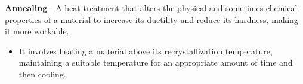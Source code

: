 \vspace{0.5cm}
    \textbf{Annealing} - A heat treatment that alters the physical and sometimes chemical properties of a material to increase its ductility and reduce its hardness, making it more workable.
    \vspace{0.15cm}
    \begin{itemize}
        \setlength\itemsep{0.5em}
        \item{It involves heating a material above its recrystallization temperature, maintaining a suitable temperature for an appropriate amount of time and then cooling.}
    \end{itemize}
